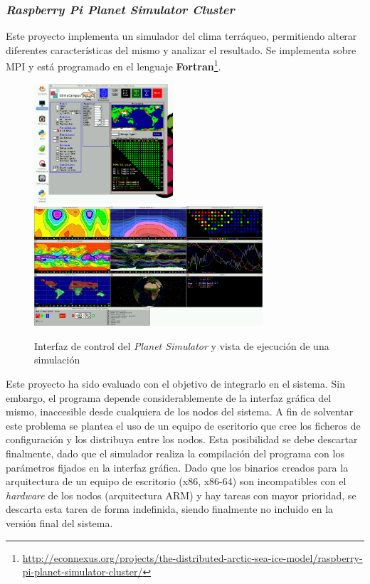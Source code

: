 \subsubsection{\textit{Raspberry Pi Planet Simulator Cluster}}

Este proyecto implementa un simulador del clima terráqueo, permitiendo alterar diferentes características del mismo y analizar el resultado. Se implementa sobre MPI y está programado en el lenguaje \textbf{Fortran}\footnote{\href{http://econnexus.org/projects/the-distributed-arctic-sea-ice-model/raspberry-pi-planet-simulator-cluster/}{http://econnexus.org/projects/the-distributed-arctic-sea-ice-model/raspberry-pi-planet-simulator-cluster/}}.

\begin{figure}[H]
	\includegraphics[height=12em]{Chapters/Chapter3/Figures/plasim-main}
	\includegraphics[height=12em]{Chapters/Chapter3/Figures/plasim-results}
	\label{fig:plasim}
	\caption[Interfaz de la aplicación \textit{Planet Simulator}]{Interfaz de control del \textit{Planet Simulator} y vista de ejecución de una simulación}
\end{figure}

Este proyecto ha sido evaluado con el objetivo de integrarlo en el sistema. Sin embargo, el programa depende considerablemente de la interfaz gráfica del mismo, inaccesible desde cualquiera de los nodos del sistema. A fin de solventar este problema se plantea el uso de un equipo de escritorio que cree los ficheros de configuración y los distribuya entre los nodos. Esta posibilidad se debe descartar finalmente, dado que el simulador realiza la compilación del programa con los parámetros fijados en la interfaz gráfica. Dado que los binarios creados para la arquitectura de un equipo de escritorio (x86, x86-64) son incompatibles con el \textit{hardware} de los nodos (arquitectura ARM) y hay tareas con mayor prioridad, se descarta esta tarea de forma indefinida, siendo finalmente no incluido en la versión final del sistema.

